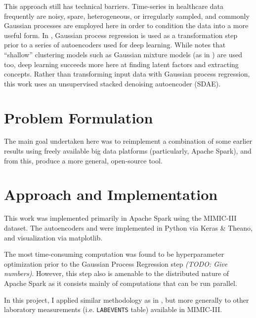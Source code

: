\documentclass[journal]{IEEEtran}
\begin{document}
This approach still has technical barriers.  Time-series in healthcare
data frequently are noisy, spare, heterogeneous, or irregularly
sampled\cite{Ghassemi2015}, and commonly Gaussian processes are
employed here in order to condition the data into a more useful form.
In \cite{Lasko2013}, Gaussian process regression is used as a
transformation step prior to a series of autoencoders used for deep
learning.  While \cite{Che2015} notes that ``shallow'' clustering
models such as Gaussian mixture models (as in \cite{Marlin}) are used
too, deep learning succeeds more here at finding latent factors and
extracting concepts.  Rather than transforming input data with
Gaussian process regression, this work uses an unsupervised stacked
denoising autoencoder (SDAE).

\section{Problem Formulation}


The main goal undertaken here was to reimplement a combination of some
earlier results using freely available big data platforms
(particularly, Apache Spark), and from this, produce a more general,
open-source tool.


\section{Approach and Implementation}


This work was implemented primarily in Apache Spark using the
MIMIC-III dataset\cite{Johnson2016a}.  The autoencoders and were
implemented in Python via Keras \& Theano, and visualization via
matplotlib.

The most time-consuming computation was found to be hyperparameter
optimization prior to the Gaussian Process Regression step
\emph{(TODO: Give numbers)}.  However, this step also is amenable to
the distributed nature of Apache Spark as it consists mainly of
computations that can be run parallel.


In this project, I applied similar methodology as in
\cite{Lasko2013,Che2015,Marlin}, but more generally to other
laboratory measurements (i.e. \texttt{LABEVENTS} table) available in
MIMIC-III\cite{Johnson2016a}.
\end{document}
